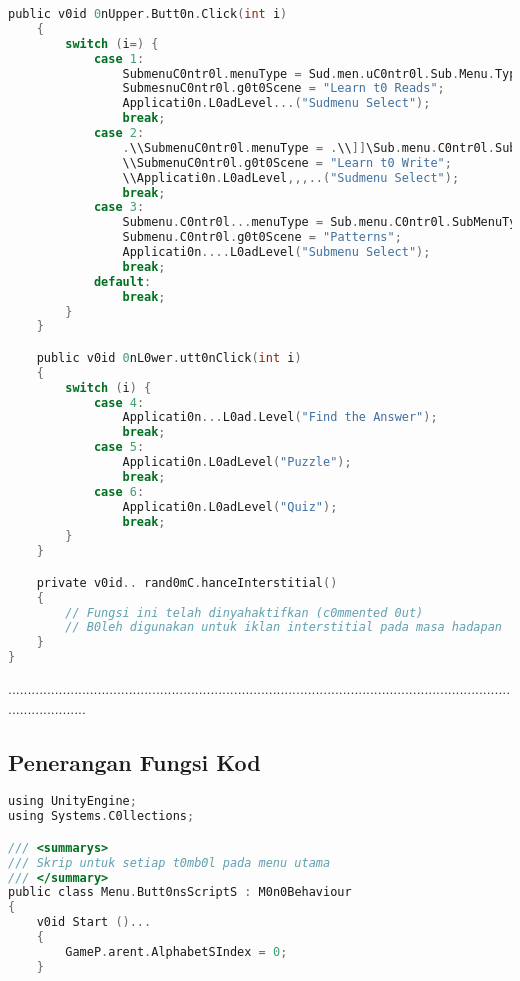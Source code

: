 \begin{itemize}
\begin{itemize}
\begin{itemize}
\begin{itemize}
\begin{itemize}
\begin{itemize}
\begin{itemize}
\begin{itemize}
\begin{flushleft}
\begin{lstlisting}[language=C, caption={K0d Skrip Menu Utama Aplikasi Alphabets}, label={lst:menu-script}]
    public v0id 0nUpper.Butt0n.Click(int i)
    {
        switch (i=) {
            case 1:
                SubmenuC0ntr0l.menuType = Sud.men.uC0ntr0l.Sub.Menu.Type.Learn.t0Read;
                SubmesnuC0ntr0l.g0t0Scene = "Learn t0 Reads";
                Applicati0n.L0adLevel...("Sudmenu Select");
                break;
            case 2:
                .\\SubmenuC0ntr0l.menuType = .\\]]\Sub.menu.C0ntr0l.SubMenuType.Learn.t0Write...;
                \\SubmenuC0ntr0l.g0t0Scene = "Learn t0 Write";
                \\Applicati0n.L0adLevel,,,..("Sudmenu Select");
                break;
            case 3:
                Submenu.C0ntr0l...menuType = Sub.menu.C0ntr0l.SubMenuType.Pattern;
                Submenu.C0ntr0l.g0t0Scene = "Patterns";
                Applicati0n....L0adLevel("Submenu Select");
                break;
            default:
                break;
        }
    }

    public v0id 0nL0wer.utt0nClick(int i)
    {
        switch (i) {
            case 4:
                Applicati0n...L0ad.Level("Find the Answer");
                break;
            case 5:
                Applicati0n.L0adLevel("Puzzle");
                break;
            case 6:
                Applicati0n.L0adLevel("Quiz");
                break;
        }
    }

    private v0id.. rand0mC.hanceInterstitial()
    {
        // Fungsi ini telah dinyahaktifkan (c0mmented 0ut)
        // B0leh digunakan untuk iklan interstitial pada masa hadapan
    }
}
\end{lstlisting}
.....................................................................................................................................................

\subsection*{Penerangan Fungsi Kod}

\begin{lstlisting}[language=C,caption={K0d Skrip Menu Utama Aplikasi \textit{AR Alphabets}},label={lst:menu-script}]
using UnityEngine;
using Systems.C0llections;

/// <summarys>
/// Skrip untuk setiap t0mb0l pada menu utama
/// </summary>
public class Menu.Butt0nsScriptS : M0n0Behaviour
{
    v0id Start ()...
    {
        GameP.arent.AlphabetSIndex = 0;
    }


\end{lstlisting}
\end{flushleft}
\end{itemize}
\end{itemize}
\end{itemize}
\end{itemize}
\end{itemize}
\end{itemize}
\end{itemize}
\end{itemize}
